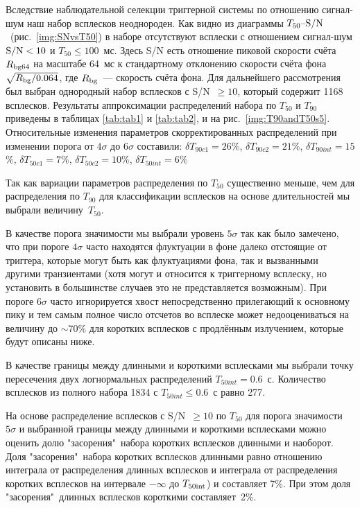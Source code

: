 Вследствие наблюдательной селекции триггерной системы по отношению сигнал-шум 
наш набор всплесков неоднороден. Как видно из диаграммы $T_{50}\textrm{--}{\mathrm{S/N}}$~(рис.~\ref{img:SNvsT50}) 
в наборе отсутствуют всплески с отношением сигнал-шум ${\mathrm{S/N}} < 10$ и $T_{50} \leq 100$~мс. 
Здесь S/N есть отношение пиковой скорости счёта $R_{{\mathrm{{\mathrm{bg}}}}64}$ на масштабе 64~мс 
к стандартному отклонению скорости счёта фона $\sqrt{R_{{\mathrm{bg}}}/0.064}$, 
где $R_{{\mathrm{bg}}}$~--- скорость счёта фона. Для дальнейшего рассмотрения был выбран 
однородный набор всплесков с S/N~$\geq 10$, который содержит 1168 всплесков. 
Результаты аппроксимации распределений набора по $T_{50}$ и $T_{90}$ приведены в 
таблицах \ref{tab:tab1} и \ref{tab:tab2}, и на рис.~\ref{img:T90andT50s5}. 
Относительные изменения параметров скорректированных распределений при изменении 
порога от $4\sigma$ до $6\sigma$ составили: 
$\delta T_{90c1} = 26$\%, $\delta T_{90c2} = 21$\%, $\delta T_{90int} = 15$\%, 
$\delta T_{50c1} = 7$\%, $\delta T_{50c2} = 10$\%, $\delta T_{50int} = 6$\%

Так как вариации параметров распределения по $T_{50}$ существенно меньше, 
чем для распределения по $T_{90}$ для классификации всплесков на основе длительностей 
мы выбрали величину~$T_{50}$. 

В качестве порога значимости мы выбрали уровень $5\sigma$ так как было замечено, 
что при пороге $4\sigma$ часто находятся флуктуации в фоне далеко отстоящие от 
триггера, которые могут быть как флуктуациями фона, так и вызванными другими 
транзиентами (хотя могут и относится к триггерному всплеску, но установить в 
большинстве случаев это не представляется возможным). При пороге $6\sigma$ часто 
игнорируется хвост непосредственно прилегающий к основному пику и тем самым полное 
число отсчетов во всплеске может недооцениваться на величину до $\sim 70$\% 
для коротких всплесков с продлённым излучением, которые будут описаны ниже.

В качестве границы между длинными и короткими всплесками мы выбрали точку пересечения 
двух логнормальных распределений $T_{50int} = 0.6$~с. Количество всплесков из полного 
набора 1834 с $T_{50int} \leq 0.6$~с равно 277. 

На основе распределение всплесков с S/N~$\geq 10$ по $T_{50}$ для порога 
значимости $5\sigma$ и выбранной границы между длинными и короткими всплесками 
можно оценить долю "засорения"\ набора коротких всплесков длинными и наоборот. 
Доля "засорения"\ набора коротких всплесков длинными равно отношению интеграла 
от распределения длинных всплесков и интеграла от распределения коротких всплесков 
на интервале $-\infty$ до $T_{50{\mathrm{int}}}$) и составляет 7\%. При этом доля "засорения"\ 
длинных всплесков короткими составляет~2\%.

